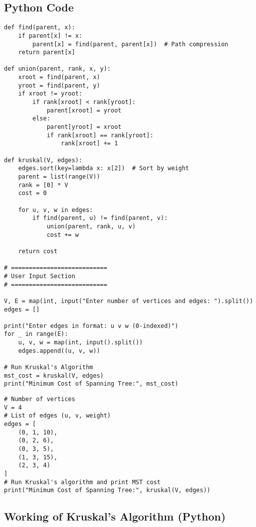 \documentclass[a4paper,14pt]{extarticle}
\begin{document}
\subsection{Python Code}
\begin{lstlisting}[style=python, caption={Kruskal's Algorithm in Python}]
def find(parent, x):
    if parent[x] != x:
        parent[x] = find(parent, parent[x])  # Path compression
    return parent[x]

def union(parent, rank, x, y):
    xroot = find(parent, x)
    yroot = find(parent, y)
    if xroot != yroot:
        if rank[xroot] < rank[yroot]:
            parent[xroot] = yroot
        else:
            parent[yroot] = xroot
            if rank[xroot] == rank[yroot]:
                rank[xroot] += 1

def kruskal(V, edges):
    edges.sort(key=lambda x: x[2])  # Sort by weight
    parent = list(range(V))
    rank = [0] * V
    cost = 0

    for u, v, w in edges:
        if find(parent, u) != find(parent, v):
            union(parent, rank, u, v)
            cost += w

    return cost

# ===========================
# User Input Section
# ===========================

V, E = map(int, input("Enter number of vertices and edges: ").split())
edges = []

print("Enter edges in format: u v w (0-indexed)")
for _ in range(E):
    u, v, w = map(int, input().split())
    edges.append((u, v, w))

# Run Kruskal's Algorithm
mst_cost = kruskal(V, edges)
print("Minimum Cost of Spanning Tree:", mst_cost)
\end{lstlisting}

\begin{verbatim}
# Number of vertices
V = 4
# List of edges (u, v, weight)
edges = [
    (0, 1, 10),
    (0, 2, 6),
    (0, 3, 5),
    (1, 3, 15),
    (2, 3, 4)
]
# Run Kruskal's algorithm and print MST cost
print("Minimum Cost of Spanning Tree:", kruskal(V, edges))

\end{verbatim}


\subsection{Working of Kruskal's Algorithm (Python)}
\end{document}
